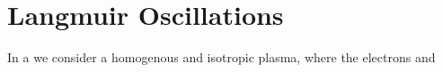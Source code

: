 
\section{Langmuir Oscillations}
	In a we consider a homogenous and isotropic plasma, where the electrons and
	
